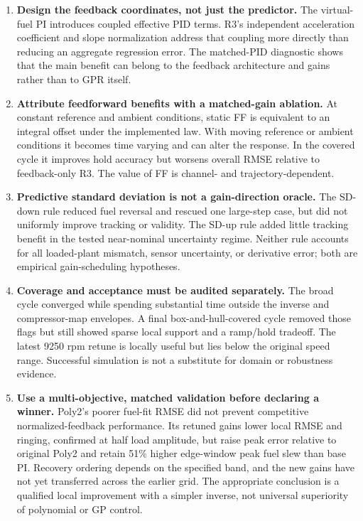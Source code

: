 \documentclass[11pt,a4paper,oneside]{report}
\begin{document}
\begin{enumerate}[label=\textbf{\arabic*.},leftmargin=*]
\item \textbf{Design the feedback coordinates, not just the predictor.} The virtual-fuel PI introduces coupled effective PID terms. R3's independent acceleration coefficient and slope normalization address that coupling more directly than reducing an aggregate regression error. The matched-PID diagnostic shows that the main benefit can belong to the feedback architecture and gains rather than to GPR itself.

\item \textbf{Attribute feedforward benefits with a matched-gain ablation.} At constant reference and ambient conditions, static FF is equivalent to an integral offset under the implemented law. With moving reference or ambient conditions it becomes time varying and can alter the response. In the covered cycle it improves hold accuracy but worsens overall RMSE relative to feedback-only R3. The value of FF is channel- and trajectory-dependent.

\item \textbf{Predictive standard deviation is not a gain-direction oracle.} The SD-down rule reduced fuel reversal and rescued one large-step case, but did not uniformly improve tracking or validity. The SD-up rule added little tracking benefit in the tested near-nominal uncertainty regime. Neither rule accounts for all loaded-plant mismatch, sensor uncertainty, or derivative error; both are empirical gain-scheduling hypotheses.

\item \textbf{Coverage and acceptance must be audited separately.} The broad cycle converged while spending substantial time outside the inverse and compressor-map envelopes. A final box-and-hull-covered cycle removed those flags but still showed sparse local support and a ramp/hold tradeoff. The latest 9250 rpm retune is locally useful but lies below the original speed range. Successful simulation is not a substitute for domain or robustness evidence.

\item \textbf{Use a multi-objective, matched validation before declaring a winner.} Poly2's poorer fuel-fit RMSE did not prevent competitive normalized-feedback performance. Its retuned gains lower local RMSE and ringing, confirmed at half load amplitude, but raise peak error relative to original Poly2 and retain 51\% higher edge-window peak fuel slew than base PI. Recovery ordering depends on the specified band, and the new gains have not yet transferred across the earlier grid. The appropriate conclusion is a qualified local improvement with a simpler inverse, not universal superiority of polynomial or GP control.
\end{enumerate}
\end{document}
